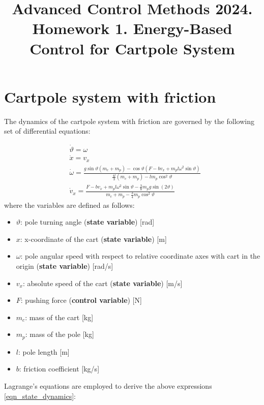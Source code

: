 \documentclass[12pt]{article}
\title{Advanced Control Methods 2024. Homework 1. Energy-Based Control for Cartpole System}
\begin{document}
\section*{Cartpole system with friction}

The dynamics of the cartpole system with friction are governed by the following set of differential equations:

\begin{equation}
    \label{eqn_state_dynamics}
    \begin{aligned}
        &\dot{\vartheta} =  \omega \\
        &\dot{x} = v_x \\
        &\dot{\omega} =  \frac{g \sin{\vartheta}(m_c + m_p) - \cos{\vartheta}(F - b v_x + m_p l \omega^2 \sin{\vartheta})}{\frac{4l}{3}(m_c + m_p) - lm_p \cos^2{\vartheta}}\\
        &\dot{v}_x = \frac{F - b v_x + m_p l \omega ^2 \sin{\vartheta} - \frac{3}{8}m_p g\sin(2\vartheta)}{m_c + m_p - \frac{3}{4} m_p \cos ^ 2 \vartheta}
    \end{aligned}
\end{equation}
where the variables are defined as follows:
\begin{itemize}
\item $\vartheta$: pole turning angle (\textbf{state variable}) [rad]
\item $x$: x-coordinate of the cart (\textbf{state variable}) [m]
\item $\omega$: pole angular speed with respect to relative coordinate axes with cart in the origin (\textbf{state variable}) [rad/s]
\item $v_x$: absolute speed of the cart (\textbf{state variable}) [m/s]
\item $F$: pushing force (\textbf{control variable}) [N]
\item $m_c$: mass of the cart [kg]
\item $m_p$: mass of the pole [kg]
\item $l$: pole length [m]
\item $b$: friction coefficient [kg/s]  
\end{itemize}
Lagrange's equations are employed to derive the above expressions \eqref{eqn_state_dynamics}:
\end{document}
